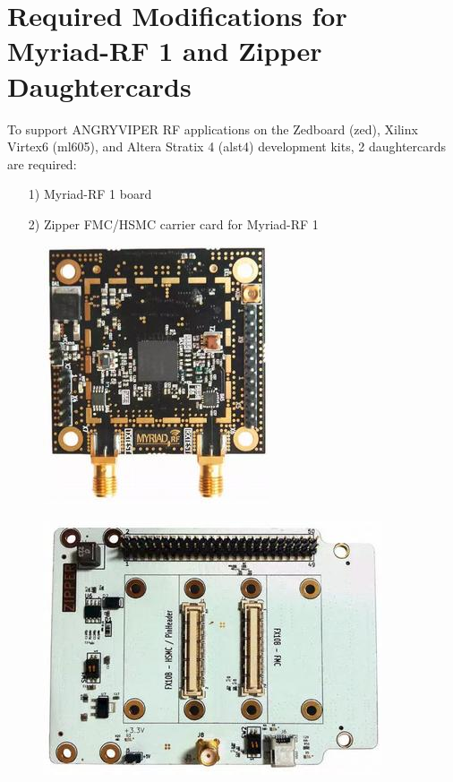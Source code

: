 \documentclass{article}
\begin{document}
\section*{Required Modifications for Myriad-RF 1 and Zipper Daughtercards}
To support ANGRYVIPER RF applications on the Zedboard (zed), Xilinx Virtex6 (ml605), and Altera Stratix 4 (alst4) development kits, 2 daughtercards are required:\par
	\begin{itemize}
	\item[1)] Myriad-RF 1 board
	\item[2)] Zipper FMC/HSMC carrier card for Myriad-RF 1
	\end{itemize}
	\begin{figure}[ht]
	\centering
		\begin{minipage}{.5\textwidth}
			\centering\includegraphics[width=0.65\linewidth]{myriadrf}
			\label{fig:myriadrf}
		\end{minipage}%
		\begin{minipage}{.5\textwidth}
			\centering\includegraphics[width=1.0\linewidth]{zipper}
			\label{fig:zipper}
		\end{minipage}
	\end{figure}
\end{document}
